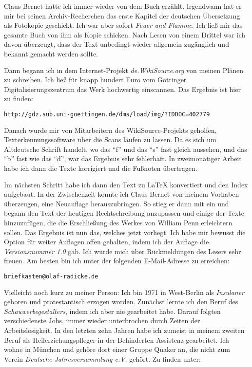 \medskip

Claus Bernet hatte ich immer wieder von dem Buch erzählt. Irgendwann hat er mir
bei seinen Archiv-Recherchen das erste Kapitel der deutschen Übersetzung als
Fotokopie geschickt. Ich war aber sofort \textit{Feuer und
Flamme}. Ich ließ mir das gesamte Buch von ihm als Kopie schicken. Nach Lesen
von einem Drittel war
ich davon überzeugt, dass der Text unbedingt wieder allgemein zugänglich und
bekannt gemacht werden sollte.

\medskip

Dann begann ich in dem Internet-Projekt \textit{de.WikiSource.org} von meinen
Plänen
zu schreiben. Ich ließ für knapp hundert Euro vom Göttinger
Digitalisierungszentrum das Werk hochwertig einscannen. Das Ergebnis ist hier zu
finden:

\begin{center}
\texttt{http://gdz.sub.uni-goettingen.de/dms/load/img/?IDDOC=402779}
\end{center}

Danach wurde mir von Mitarbeitern des WikiSource-Projekts geholfen,
Texterkennungssoftware über die Scans laufen zu lassen. Da es sich um
Altdeutsche Schrift handelt, wo das "`f"' und das "`s"' fast gleich aussehen,
und das "`b"' fast wie das "`d"', war das Ergebnis sehr fehlerhaft. In
zweimonatiger Arbeit habe ich dann die Texte korrigiert und die Fußnoten
übertragen.

\medskip

Im nächsten Schritt habe ich dann den Text zu \LaTeX{} konvertiert und den Index
aufgebaut. In der Zwischenzeit konnte ich Claus Bernet von meinem Vorhaben
überzeugen, eine
Neuauflage herauszubringen. So stieg er dann mit ein und begann
den Text der heutigen Rechtschreibung anzupassen und einige der Texte
hinzuzufügen, die die 
Erschließung des Werkes von William Penn erleichtern sollen.
Das Ergebnis ist nun das, welches jetzt vorliegt. Ich habe mir bewusst die
Option für weiter Auflagen offen gehalten, indem ich der Auflage die
\textit{Versionsnummer 1.0} gab. Ich würde mich über Rückmeldungen des Lesers
sehr freuen. Am besten bin ich unter der folgenden E-Mail-Adresse zu erreichen:

\begin{center}
\texttt{briefkasten@olaf-radicke.de}
\end{center}

Vielleicht noch kurz zu meiner Person: Ich bin 1971 in West-Berlin
als \textit{Insulaner} geboren und protestantisch erzogen worden. Zunächst lernte
ich den Beruf des \textit{Schauwerbegestalters}, indem ich aber nie gearbeitet
habe. Darauf folgten verschiedenste Jobs, immer wieder unterbrochen durch Zeiten
der Arbeitslosigkeit. In den letzten zehn Jahren habe ich zumeist in meinem
zweiten Beruf als Heilerziehungspfleger in der Behinderten-Assistenz gearbeitet.
Ich wohne in München und gehöre dort einer Gruppe Quaker an, die nicht zum
Verein \textit{Deutsche Jahresversammlung e.V}. gehört. Zu finden unter:

